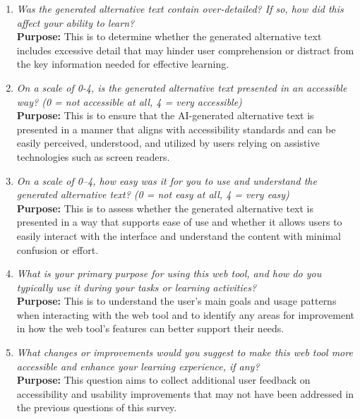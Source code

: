 \documentclass[12pt, titlepage]{article}
\begin{document}
\begin{enumerate}[label=UA-Q \arabic*., wide=0pt, leftmargin=*]
  \item \emph{Was the generated alternative text contain over-detailed? If so, how did this affect 
  your ability to learn?}\\[2mm]
    {\bf Purpose:} This is to determine whether the generated alternative text includes excessive detail that may hinder user 
    comprehension or distract from the key information needed for effective learning.

  \item \emph{On a scale of 0-4, is the generated alternative text presented in an accessible way? (0 = not accessible at all, 4 = very accessible)}\\[2mm]
    {\bf Purpose:} This is to ensure that the AI-generated alternative text is presented in a manner that aligns with accessibility standards and 
    can be easily perceived, understood, and utilized by users relying on assistive technologies such as screen readers.

  \item \emph{On a scale of 0–4, how easy was it for you to use and understand the generated alternative text? (0 = not easy at all, 4 = very easy)}\\[2mm]
    {\bf Purpose:} This is to assess whether the generated alternative text is presented in a way that supports ease of use and whether it allows users to easily interact with 
    the interface and understand the content with minimal confusion or effort.
  
  \item \emph{What is your primary purpose for using this web tool, and how do you typically use it during your tasks or learning activities?}\\[2mm]
  {\bf Purpose:} This is to understand the user’s main goals and usage patterns when interacting with the web tool and to identify any areas for improvement in how the web tool's features 
  can better support their needs.

  \item \emph{What changes or improvements would you suggest to make this web tool more accessible and enhance your learning experience, if any?}\\[2mm]
  {\bf Purpose:} This question aims to collect additional user feedback on accessibility and usability improvements that may not have been addressed in the previous questions of this survey.

\end{enumerate}
\end{document}
